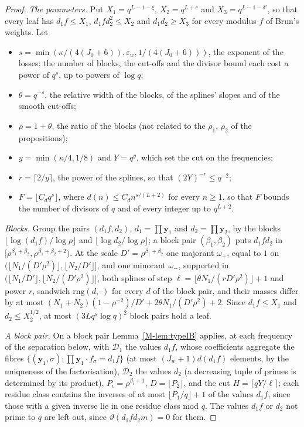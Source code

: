 \documentclass[11pt]{article}
\numberwithin{equation}{section}
\begin{document}
\begin{proof}
\emph{The parameters.} Put $X_1 = q^{L - 1 - \xi}$, $X_2 = q^{L + c}$ and $X_3 = q^{L - 1 - \delta'}$, so that every
leaf
has $d_1 f \le X_1$, $d_1 f d_2^2 \le X_2$ and $d_1 d_2 \ge X_3$ for every modulus $f$ of Brun's weights. Let
\begin{itemize}
\item $s = \min(\kappa/(4(J_0 + 6)), \varepsilon_w, 1/(4(J_0 + 6)))$, the exponent of the losses: the number of
  blocks, the cut-offs and the divisor bound each cost a power of $q^s$, up to powers of $\log q$;
\item $\theta = q^{-s}$, the relative width of the blocks, of the splines' slopes and of the smooth cut-offs;
\item $\rho = 1 + \theta$, the ratio of the blocks (not related to the $\rho_1$, $\rho_2$ of the propositions);
\item $y = \min(\kappa/4, 1/8)$ and $Y = q^y$, which set the cut on the frequencies;
\item $r = \lceil 2/y \rceil$, the power of the splines, so that $(2Y)^{-r} \le q^{-2}$;
\item $F = \lfloor C_d q^s \rfloor$, where $d(n) \le C_d n^{s/(L + 2)}$ for every $n \ge 1$, so that $F$ bounds the
  number of divisors of $q$ and of every integer up to $q^{L + 2}$.
\end{itemize}

\emph{Blocks.} Group the pairs $(d_1 f, d_2)$, $d_1 = \prod \mathbf y_1$ and $d_2 = \prod \mathbf y_2$, by the blocks
$\lfloor \log(d_1 f)/\log \rho \rfloor$ and $\lfloor \log d_2/\log \rho \rfloor$; a block pair $(\beta_1, \beta_2)$ puts
$d_1 f d_2$ in $[\rho^{\beta_1 + \beta_2}, \rho^{\beta_1 + \beta_2 + 2})$. At the scale $D' = \rho^{\beta_1 + \beta_2}$
one majorant $\omega_+$, equal to $1$ on $(\lfloor N_1/(D'\rho^2) \rfloor, \lfloor N_2/D' \rfloor]$, and one minorant
$\omega_-$,
supported in $(\lfloor N_1/D' \rfloor, \lfloor N_2/(D'\rho^2) \rfloor]$, both splines of step $\ell = \lfloor \theta
N_1/(rD'\rho^2) \rfloor + 1$ and power $r$, sandwich $\mathrm{rng}(d, \cdot)$ for every $d$ of the block pair, and their
masses differ by at most $(N_1 + N_2)(1 - \rho^{-2})/D' + 2\theta N_1/(D'\rho^2) + 2$. Since $d_1 f \le X_1$ and $d_2
\le X_2^{1/2}$, at most $(3Lq^s \log q)^2$ block pairs hold a leaf.

\emph{A block pair.} On a block pair Lemma~\ref{M-lem:typeIB} applies, at each frequency of the separation below, with
$\mathcal D_1$ the values $d_1 f$, whose coefficients aggregate the fibres $\{(\mathbf y_1, \sigma) : \prod \mathbf y_1
\cdot f_\sigma = d_1 f\}$ (at most $(J_w + 1) d(d_1 f)$ elements, by the uniqueness of the factorisation), $\mathcal
D_2$ the values $d_2$ (a decreasing tuple of primes is determined by its product), $P_\iota = \rho^{\beta_\iota + 1}$,
$D = \lfloor P_2 \rfloor$, and the cut $H = \lceil qY/\ell \rceil$; each residue class contains the inverses of at most
$\lfloor P_1/q \rfloor + 1$ of the values $d_1 f$, since those with a given inverse lie in one residue class mod $q$.
The values $d_1 f$ or $d_2$ not prime to $q$ are left out, since $\vartheta(d_1 f d_2 m) = 0$ for them.


\end{proof}
\end{document}
